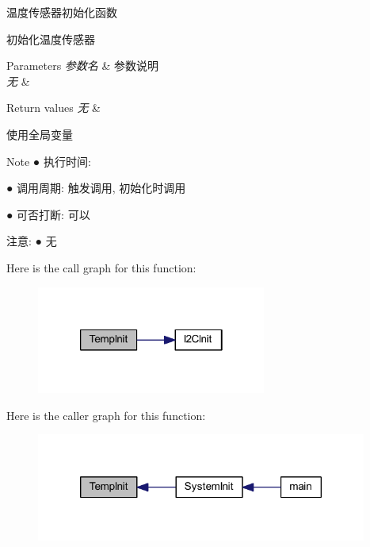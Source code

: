 温度传感器初始化函数 

初始化温度传感器


\begin{DoxyParams}{\-Parameters}
{\em 参数名} & 参数说明 \\
\hline
{\em 无} & \\
\hline
\end{DoxyParams}

\begin{DoxyRetVals}{\-Return values}
{\em 无} & \\
\hline
\end{DoxyRetVals}
\begin{DoxyParagraph}{使用全局变量 }

\end{DoxyParagraph}
\begin{DoxyNote}{\-Note}
● 执行时间\-: \par
 ● 调用周期\-: 触发调用, 初始化时调用 \par
 ● 可否打断\-: 可以 \par

\end{DoxyNote}
\begin{DoxyParagraph}{注意\-:}
● 无 \par
 
\end{DoxyParagraph}


\-Here is the call graph for this function\-:\nopagebreak
\begin{figure}[H]
\begin{center}
\leavevmode
\includegraphics[width=214pt]{group___t_e_m_p_ga57159917434e76ddd7c731318a358dd6_cgraph}
\end{center}
\end{figure}




\-Here is the caller graph for this function\-:\nopagebreak
\begin{figure}[H]
\begin{center}
\leavevmode
\includegraphics[width=308pt]{group___t_e_m_p_ga57159917434e76ddd7c731318a358dd6_icgraph}
\end{center}
\end{figure}


